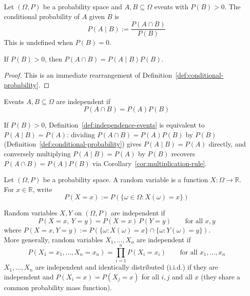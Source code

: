 		\begin{definition}
			\label{def:conditional-probability}
			Let $(\Omega,P)$ be a probability space and $A, B \subseteq \Omega$ events with $P(B)>0$. The conditional probability of $A$ given $B$ is
			\[
				P(A\mid B) := \frac{P(A\cap B)}{P(B)}
			\]
			This is undefined when $P(B)=0$.
		\end{definition}
		
		\begin{corollary}
			\label{cor:multiplication-rule}
			If $P(B)>0$, then $P(A\cap B) = P(A\mid B)P(B)$.
		\end{corollary}
		
		\begin{proof}
			This is an immediate rearrangement of Definition~\ref{def:conditional-probability}.
		\end{proof}
		
		\begin{definition}
			\label{def:independence-events}
			Events $A,B\subseteq\Omega$ are independent if
			\[
				P(A\cap B) = P(A)P(B)
			\]
		\end{definition}
		
		\begin{remark}
			\label{rem:independence-conditional}
			If $P(B)>0$, Definition~\ref{def:independence-events} is equivalent to $P(A\mid B) = P(A)$: dividing $P(A\cap B)=P(A)P(B)$ by $P(B)$ (Definition~\ref{def:conditional-probability}) gives $P(A\mid B)=P(A)$ directly, and conversely multiplying $P(A\mid B)=P(A)$ by $P(B)$ recovers $P(A\cap B)=P(A)P(B)$ via Corollary~\ref{cor:multiplication-rule}.
		\end{remark}
		
		\begin{definition}
			\label{def:random-variable}
			Let $(\Omega,P)$ be a probability space. A random variable is a function $X:\Omega\to\mathbb{R}$. For $x\in\mathbb{R}$, write
			\[
				P(X=x) := P(\{\omega\in\Omega : X(\omega)=x\})
			\]
		\end{definition}
		
		\begin{definition}
			\label{def:independence-random-variables}
			Random variables $X,Y$ on $(\Omega,P)$ are independent if
			\[
				P(X=x,\, Y=y) = P(X=x)\,P(Y=y) \qquad \text{for all } x,y
			\]
			where $P(X=x,Y=y) := P(\{\omega : X(\omega)=x\}\cap\{\omega:Y(\omega)=y\})$. \\
			More generally, random variables $X_1,\dots,X_n$ are independent if
			\[
				P(X_1=x_1,\dots,X_n=x_n) = \prod_{i=1}^n P(X_i=x_i) \qquad \text{for all } x_1,\dots,x_n
			\]
			$X_1,\dots,X_n$ are independent and identically distributed (i.i.d.) if they are independent and $P(X_i=x)=P(X_j=x)$ for all $i,j$ and all $x$ (they share a common probability mass function).
		\end{definition}
		
